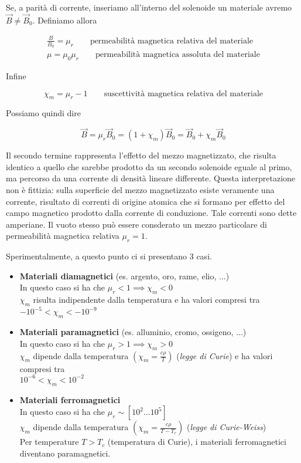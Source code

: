 Se, a parità di corrente, inseriamo all'interno del solenoide un materiale avremo $ \vec{B}  \neq \vec{B}_0  $. Definiamo allora

\begin{gather*}
	\frac{B}{B_0}= \mu_r \qquad \text{permeabilità magnetica relativa del materiale} \\
	\mu = \mu_0 \mu_r \qquad \text{permeabilità magnetica assoluta del materiale}
\end{gather*}

Infine

\[
	\chi_m = \mu_r -1 \qquad \text{suscettività magnetica relativa del materiale}
\]

Possiamo quindi dire

\[
	\vec{B} = \mu_r \vec{B}_0 = (1 + \chi_m) \vec{B}_0 = \vec{B}_0 + \chi_m\vec{B}_0
\]

Il secondo termine rappresenta l'effetto del mezzo magnetizzato, che risulta identico a quello che sarebbe prodotto da un secondo solenoide eguale al primo, ma percorso da una corrente di densità lineare differente. Questa interpretazione non è fittizia: sulla superficie del mezzo magnetizzato esiste veramente una corrente, risultato di correnti di origine atomica che si formano per effetto del campo magnetico prodotto dalla corrente di conduzione. Tale correnti sono dette amperiane.
Il vuoto stesso può essere consderato un mezzo particolare di permeabilità magnetica relativa $ \mu_r = 1 $.

Sperimentalmente, a questo punto ci si presentano 3 casi.

\begin{itemize}
	\item \textbf{Materiali diamagnetici} (es. argento, oro, rame, elio, $\dots$) \\
	In questo caso si ha che $\boxed{ \mu_r < 1 \implies \chi_m < 0}$\\
	$ \chi_m  $ risulta indipendente dalla temperatura e ha valori compresi tra $ -10^{-5} < \chi_m < -10^{-9} $

	\item \textbf{Materiali paramagnetici} (es. alluminio, cromo, ossigeno, $\dots$) \\
	In questo caso si ha che $\boxed{ \mu_r > 1 \implies \chi_m > 0} $\\
	$ \chi_m  $ dipende dalla temperatura $ \left( \chi_m=\frac{c\rho}{T} \right)   $ (\emph{legge di Curie})  e ha valori compresi tra \\ $10^{-6}<\chi_m<10^{-2}$

	\item \textbf{Materiali ferromagnetici}\\
	In questo caso si ha che $\boxed{ \mu_r \sim [10^2\ldots 10^5]}$\\
	$ \chi_m  $ dipende dalla temperatura $ \left( \chi_m=\frac{c\rho}{T-T_c} \right) $ (\emph{legge di Curie-Weiss})\\
	Per temperature $ T>T_c $ (temperatura di Curie), i materiali ferromagnetici diventano paramagnetici.
\end{itemize}

